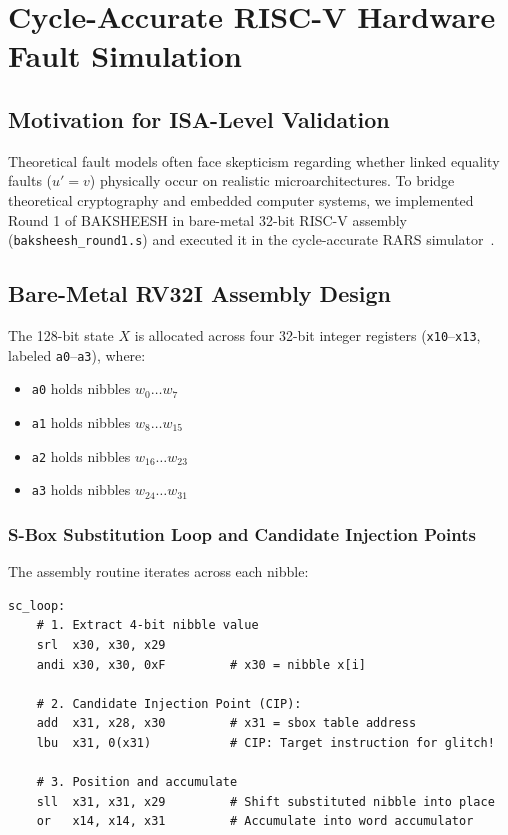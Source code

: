 \chapter{Cycle-Accurate RISC-V Hardware Fault Simulation}
\label{ch:riscv}

\section{Motivation for ISA-Level Validation}
\label{sec:riscv_motivation}
Theoretical fault models often face skepticism regarding whether linked equality faults ($u' = v$) physically occur on realistic microarchitectures. To bridge theoretical cryptography and embedded computer systems, we implemented Round 1 of BAKSHEESH in bare-metal 32-bit RISC-V assembly (\texttt{baksheesh\_round1.s}) and executed it in the cycle-accurate RARS simulator~\cite{rars_simulator}.

\section{Bare-Metal RV32I Assembly Design}
\label{sec:rv32i_design}
The 128-bit state $X$ is allocated across four 32-bit integer registers (\texttt{x10}--\texttt{x13}, labeled \texttt{a0}--\texttt{a3}), where:
\begin{itemize}
    \item \texttt{a0} holds nibbles $w_0 \dots w_7$
    \item \texttt{a1} holds nibbles $w_8 \dots w_{15}$
    \item \texttt{a2} holds nibbles $w_{16} \dots w_{23}$
    \item \texttt{a3} holds nibbles $w_{24} \dots w_{31}$
\end{itemize}

\subsection{S-Box Substitution Loop and Candidate Injection Points}
The assembly routine iterates across each nibble:
\begin{lstlisting}[language={[RISC-V]Assembler}, caption={RV32I S-Box Substitution Loop and Candidate Injection Point (CIP).}]
sc_loop:
    # 1. Extract 4-bit nibble value
    srl  x30, x30, x29
    andi x30, x30, 0xF         # x30 = nibble x[i]
    
    # 2. Candidate Injection Point (CIP):
    add  x31, x28, x30         # x31 = sbox table address
    lbu  x31, 0(x31)           # CIP: Target instruction for glitch!
    
    # 3. Position and accumulate
    sll  x31, x31, x29         # Shift substituted nibble into place
    or   x14, x14, x31         # Accumulate into word accumulator
\end{lstlisting}

